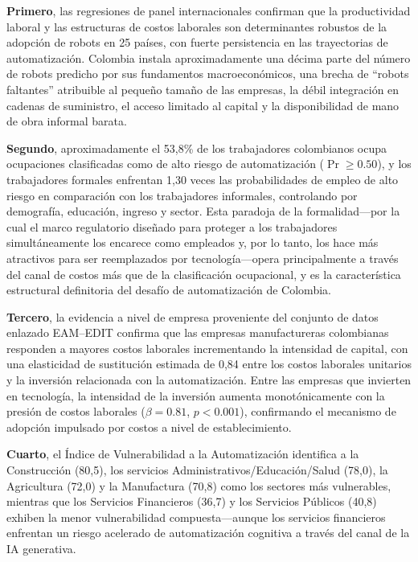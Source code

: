 \documentclass{article}
\begin{document}
\textbf{Primero}, las regresiones de panel internacionales confirman que la productividad laboral y las estructuras de costos laborales son determinantes robustos de la adopci\'on de robots en 25 pa\'ises, con fuerte persistencia en las trayectorias de automatizaci\'on. Colombia instala aproximadamente una d\'ecima parte del n\'umero de robots predicho por sus fundamentos macroecon\'omicos, una brecha de ``robots faltantes'' atribuible al peque\~no tama\~no de las empresas, la d\'ebil integraci\'on en cadenas de suministro, el acceso limitado al capital y la disponibilidad de mano de obra informal barata.

\textbf{Segundo}, aproximadamente el 53,8\% de los trabajadores colombianos ocupa ocupaciones clasificadas como de alto riesgo de automatizaci\'on ($\Pr \geq 0.50$), y los trabajadores formales enfrentan 1,30 veces las probabilidades de empleo de alto riesgo en comparaci\'on con los trabajadores informales, controlando por demograf\'ia, educaci\'on, ingreso y sector. Esta paradoja de la formalidad---por la cual el marco regulatorio dise\~nado para proteger a los trabajadores simult\'aneamente los encarece como empleados y, por lo tanto, los hace m\'as atractivos para ser reemplazados por tecnolog\'ia---opera principalmente a trav\'es del canal de costos m\'as que de la clasificaci\'on ocupacional, y es la caracter\'istica estructural definitoria del desaf\'io de automatizaci\'on de Colombia.

\textbf{Tercero}, la evidencia a nivel de empresa proveniente del conjunto de datos enlazado EAM--EDIT confirma que las empresas manufactureras colombianas responden a mayores costos laborales incrementando la intensidad de capital, con una elasticidad de sustituci\'on estimada de 0,84 entre los costos laborales unitarios y la inversi\'on relacionada con la automatizaci\'on. Entre las empresas que invierten en tecnolog\'ia, la intensidad de la inversi\'on aumenta monot\'onicamente con la presi\'on de costos laborales ($\beta = 0.81$, $p < 0.001$), confirmando el mecanismo de adopci\'on impulsado por costos a nivel de establecimiento.

\textbf{Cuarto}, el \'Indice de Vulnerabilidad a la Automatizaci\'on identifica a la Construcci\'on (80,5), los servicios Administrativos/Educaci\'on/Salud (78,0), la Agricultura (72,0) y la Manufactura (70,8) como los sectores m\'as vulnerables, mientras que los Servicios Financieros (36,7) y los Servicios P\'ublicos (40,8) exhiben la menor vulnerabilidad compuesta---aunque los servicios financieros enfrentan un riesgo acelerado de automatizaci\'on cognitiva a trav\'es del canal de la IA generativa.
\end{document}
